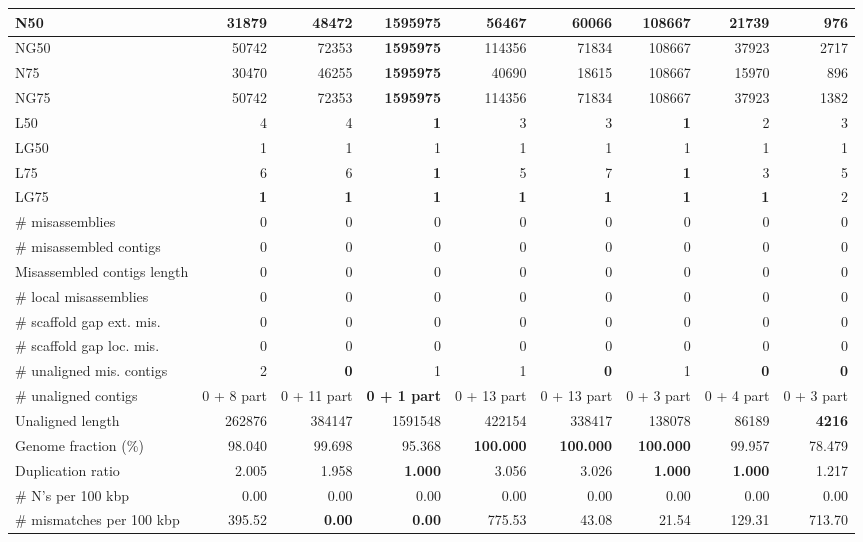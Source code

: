 \documentclass[12pt,a4paper]{article}
\begin{document}
\begin{table}[ht]
\begin{center}
\begin{tabular}{|l*{8}{|r}|}
N50 & 31879 & 48472 & {\bf 1595975} & 56467 & 60066 & 108667 & 21739 & 976 \\ \hline
NG50 & 50742 & 72353 & {\bf 1595975} & 114356 & 71834 & 108667 & 37923 & 2717 \\ \hline
N75 & 30470 & 46255 & {\bf 1595975} & 40690 & 18615 & 108667 & 15970 & 896 \\ \hline
NG75 & 50742 & 72353 & {\bf 1595975} & 114356 & 71834 & 108667 & 37923 & 1382 \\ \hline
L50 & 4 & 4 & {\bf 1} & 3 & 3 & {\bf 1} & 2 & 3 \\ \hline
LG50 & 1 & 1 & 1 & 1 & 1 & 1 & 1 & 1 \\ \hline
L75 & 6 & 6 & {\bf 1} & 5 & 7 & {\bf 1} & 3 & 5 \\ \hline
LG75 & {\bf 1} & {\bf 1} & {\bf 1} & {\bf 1} & {\bf 1} & {\bf 1} & {\bf 1} & 2 \\ \hline
\# misassemblies & 0 & 0 & 0 & 0 & 0 & 0 & 0 & 0 \\ \hline
\# misassembled contigs & 0 & 0 & 0 & 0 & 0 & 0 & 0 & 0 \\ \hline
Misassembled contigs length & 0 & 0 & 0 & 0 & 0 & 0 & 0 & 0 \\ \hline
\# local misassemblies & 0 & 0 & 0 & 0 & 0 & 0 & 0 & 0 \\ \hline
\# scaffold gap ext. mis. & 0 & 0 & 0 & 0 & 0 & 0 & 0 & 0 \\ \hline
\# scaffold gap loc. mis. & 0 & 0 & 0 & 0 & 0 & 0 & 0 & 0 \\ \hline
\# unaligned mis. contigs & 2 & {\bf 0} & 1 & 1 & {\bf 0} & 1 & {\bf 0} & {\bf 0} \\ \hline
\# unaligned contigs & 0 + 8 part & 0 + 11 part & {\bf 0 + 1 part} & 0 + 13 part & 0 + 13 part & 0 + 3 part & 0 + 4 part & 0 + 3 part \\ \hline
Unaligned length & 262876 & 384147 & 1591548 & 422154 & 338417 & 138078 & 86189 & {\bf 4216} \\ \hline
Genome fraction (\%) & 98.040 & 99.698 & 95.368 & {\bf 100.000} & {\bf 100.000} & {\bf 100.000} & 99.957 & 78.479 \\ \hline
Duplication ratio & 2.005 & 1.958 & {\bf 1.000} & 3.056 & 3.026 & {\bf 1.000} & {\bf 1.000} & 1.217 \\ \hline
\# N's per 100 kbp & 0.00 & 0.00 & 0.00 & 0.00 & 0.00 & 0.00 & 0.00 & 0.00 \\ \hline
\# mismatches per 100 kbp & 395.52 & {\bf 0.00} & {\bf 0.00} & 775.53 & 43.08 & 21.54 & 129.31 & 713.70 \\ \hline

\end{tabular}
\end{center}
\end{table}
\end{document}
